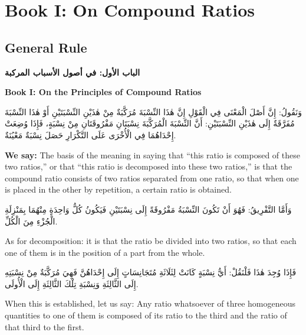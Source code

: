 \documentclass[11pt,a4paper]{article}
\theoremstyle{plain}
\theoremstyle{definition}
\theoremstyle{remark}
\newcommand{\ar}[1]{{\arabicfont\beginR #1\endR}}
\newcommand{\bilingualpair}[2]{%
  \par\noindent
  \begin{minipage}[t]{0.48\textwidth}
  #1
  \end{minipage}%
  \hfill
  \begin{minipage}[t]{0.48\textwidth}
  \vspace*{0pt}#2
  \end{minipage}\par\vspace{0.3cm}%
}
\begin{document}
\clearpage


\section{Book I: On Compound Ratios}
\label{sec:book1}

\subsection*{General Rule}

\bilingualpair{\noindent\textcolor{arabicblue}{\textbf{\ar{الباب الأول: في أصول الأسباب المركبة}}}}{\noindent\textcolor{sectioncolor}{\textbf{Book I: On the Principles of Compound Ratios}}}

\vspace{0.3cm}

\bilingualpair{\ar{وَنَقُولُ: إِنَّ أَصْلَ الْمَعْنَى فِي الْقَوْلِ إِنَّ هٰذَا النِّسْبَةَ مُرَكَّبَةٌ مِنْ هٰذَيْنِ النِّسْبَتَيْنِ أَوْ هٰذَا النِّسْبَةَ مُفَرَّقَةٌ إِلَى هٰذَيْنِ النِّسْبَتَيْنِ: أَنَّ النِّسْبَةَ الْمُرَكَّبَةَ نِسْبَتَانِ مَفْرُوقَتَانِ مِنْ نِسْبَةٍ، فَإِذَا وُضِعَتْ إِحْدَاهُمَا فِي الْأُخْرَى عَلَى التَّكْرَارِ حَصَلَ نِسْبَةٌ مَعْيُنَةٌ.}}{\noindent\textbf{We say:} The basis of the meaning in saying that ``this ratio is composed of these two ratios,'' or that ``this ratio is decomposed into these two ratios,'' is that the compound ratio consists of two ratios separated from one ratio, so that when one is placed in the other by repetition, a certain ratio is obtained.}

\vspace{0.3cm}

\bilingualpair{\ar{وَأَمَّا التَّفْرِيقُ: فَهُوَ أَنْ تَكُونَ النِّسْبَةُ مَفْرُوقَةً إِلَى نِسْبَتَيْنِ فَيَكُونُ كُلُّ وَاحِدَةٍ مِنْهُمَا بِمَنْزِلَةِ الْجُزْءِ مِنَ الْكُلِّ.}}{As for decomposition: it is that the ratio be divided into two ratios, so that each one of them is in the position of a part from the whole.}

\vspace{0.3cm}

\bilingualpair{\ar{فَإِذَا وُجِدَ هٰذَا فَلْنَقُلْ: أَيُّ نِسْبَةٍ كَانَتْ لِثَلَاثَةِ مُتَجَانِسَاتٍ إِلَى إِحْدَاهُنَّ فَهِيَ مُرَكَّبَةٌ مِنْ نِسْبَتِهِ إِلَى الثَّالِثَةِ وَنِسْبَةِ تِلْكَ الثَّالِثَةِ إِلَى الْأُولَى.}}{When this is established, let us say: Any ratio whatsoever of three homogeneous quantities to one of them is composed of its ratio to the third and the ratio of that third to the first.}
\end{document}
